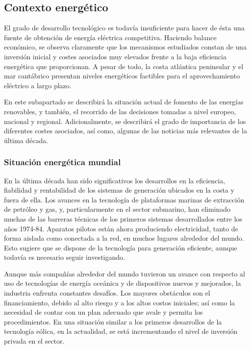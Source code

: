 \subsection{Contexto energético}\label{header-n2}

El grado de desarrollo tecnológico es todavía insuficiente para hacer de
ésta una fuente de obtención de energía eléctrica competitiva. Haciendo
balance económico, se observa claramente que los mecanismos estudiados
constan de una inversión inicial y costes asociados muy elevados frente
a la baja eficiencia energética que proporcionan. A pesar de todo, la
costa atlántica peninsular y el mar cantábrico presentan niveles
energéticos factibles para el aprovechamiento eléctrico a largo plazo.

En este subapartado se describirá la situación actual de fomento de las
energías renovables, y también, el recorrido de las decisiones tomadas a
nivel europeo, nacional y regional. Adicionalmente, se describirá el
grado de importancia de los diferentes costes asociados, así como,
algunas de las noticias más relevantes de la última década.

\subsubsection{Situación energética mundial}\label{header-n9}

En la última década han sido significativos los desarrollos en la
eficiencia, fiabilidad y rentabilidad de los sistemas de generación
ubicados en la costa y fuera de ella. Los avances en la tecnología de
plataformas marinas de extracción de petróleo y gas, y, particularmente
en el sector submarino, han eliminado muchas de las barreras técnicas de
los primeros sistemas desarrollados entre los años 1974-84. Aparatos
pilotos están ahora produciendo electricidad, tanto de forma aislada
como conectada a la red, en muchos lugares alrededor del mundo. Esto
sugiere que se dispone de la tecnología para generación eficiente,
aunque todavía es necesario seguir investigando.

Aunque más compañías alrededor del mundo tuvieron un avance con respecto
al uso de tecnologías de energía oceánica y de dispositivos nuevos y
mejorados, la industria enfrenta constantes desafíos. Los mayores
obstáculos son el financiamiento, debido al alto riesgo y a los altos
costos iniciales; así como la necesidad de contar con un plan adecuado
que avale y permita los procedimientos. En una situación similar a los
primeros desarrollos de la tecnología eólica, en la actualidad, se está
incrementando el nivel de inversión privada en el sector.


